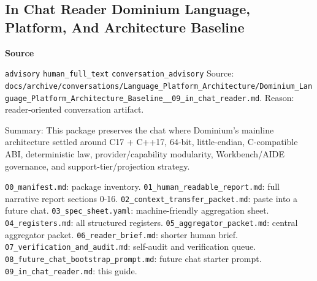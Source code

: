 \documentclass[9pt,a4paper,openany]{book}
\newcommand{\vonecallout}[3]{\par\medskip\noindent\begingroup\setlength{\fboxsep}{7pt}\colorbox{DomCalloutBg}{\parbox{0.94\linewidth}{\textbf{\textcolor{#1}{#2}}\par #3}}\endgroup\par\medskip}
\begin{document}
\subsection{In Chat Reader Dominium Language, Platform, And Architecture Baseline}

\vonecallout{DomSlate}{Source}{\texttt{advisory} \texttt{human\_\allowbreak{}full\_\allowbreak{}text} \texttt{conversation\_\allowbreak{}advisory} Source: \texttt{docs/\allowbreak{}archive/\allowbreak{}conversations/\allowbreak{}Language\_\allowbreak{}Platform\_\allowbreak{}Architecture/\allowbreak{}Dominium\_\allowbreak{}Language\_\allowbreak{}Platform\_\allowbreak{}Architecture\_\allowbreak{}Baseline\_\allowbreak{}\_\allowbreak{}09\_\allowbreak{}in\_\allowbreak{}chat\_\allowbreak{}reader.\allowbreak{}md}.\allowbreak{} Reason: reader-\allowbreak{}oriented conversation artifact.\allowbreak{}}

Summary: This package preserves the chat where Dominium's mainline architecture settled around C17 + C++17, 64-\allowbreak{}bit, little-\allowbreak{}endian, C-\allowbreak{}compatible ABI, deterministic law, provider/\allowbreak{}capability modularity, Workbench/\allowbreak{}AIDE governance, and support-\allowbreak{}tier/\allowbreak{}projection strategy.\allowbreak{}


\texttt{00\_\allowbreak{}manifest.\allowbreak{}md}: package inventory.\allowbreak{} \texttt{01\_\allowbreak{}human\_\allowbreak{}readable\_\allowbreak{}report.\allowbreak{}md}: full narrative report sections 0-\allowbreak{}16.\allowbreak{} \texttt{02\_\allowbreak{}context\_\allowbreak{}transfer\_\allowbreak{}packet.\allowbreak{}md}: paste into a future chat.\allowbreak{} \texttt{03\_\allowbreak{}spec\_\allowbreak{}sheet.\allowbreak{}yaml}: machine-\allowbreak{}friendly aggregation sheet.\allowbreak{} \texttt{04\_\allowbreak{}registers.\allowbreak{}md}: all structured registers.\allowbreak{} \texttt{05\_\allowbreak{}aggregator\_\allowbreak{}packet.\allowbreak{}md}: central aggregator packet.\allowbreak{} \texttt{06\_\allowbreak{}reader\_\allowbreak{}brief.\allowbreak{}md}: shorter human brief.\allowbreak{} \texttt{07\_\allowbreak{}verification\_\allowbreak{}and\_\allowbreak{}audit.\allowbreak{}md}: self-\allowbreak{}audit and verification queue.\allowbreak{} \texttt{08\_\allowbreak{}future\_\allowbreak{}chat\_\allowbreak{}bootstrap\_\allowbreak{}prompt.\allowbreak{}md}: future chat starter prompt.\allowbreak{} \texttt{09\_\allowbreak{}in\_\allowbreak{}chat\_\allowbreak{}reader.\allowbreak{}md}: this guide.\allowbreak{}
\end{document}
